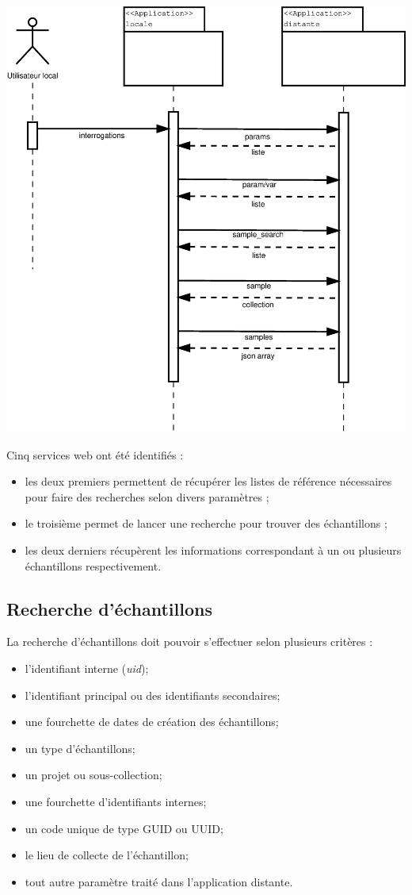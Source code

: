 \includegraphics[width=\linewidth]{images/sequence}

Cinq services web ont été identifiés :
\begin{itemize}
\item les deux premiers permettent de récupérer les listes de référence nécessaires pour faire des recherches selon divers paramètres ;
\item le troisième permet de lancer une recherche pour trouver des échantillons ;
\item les deux derniers récupèrent les informations correspondant à un ou plusieurs échantillons respectivement.
\end{itemize}


\subsection{Recherche d'échantillons}
La recherche d'échantillons doit pouvoir s'effectuer selon plusieurs critères :
\begin{itemize}
\item l'identifiant interne (\textit{uid});
\item l'identifiant principal ou des identifiants secondaires;
\item une fourchette de dates de création des échantillons;
\item un type d'échantillons;
\item un projet ou sous-collection;
\item une fourchette d'identifiants internes;
\item un code unique de type GUID ou UUID;
\item le lieu de collecte de l'échantillon;
\item tout autre paramètre traité dans l'application distante.
\end{itemize}

